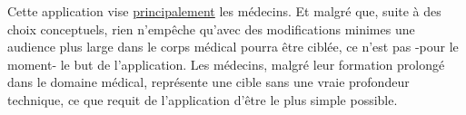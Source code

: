Cette application vise \underline{principalement} les médecins. Et
malgré que, suite à des choix conceptuels, rien n’empêche qu’avec des
modifications minimes une audience plus large dans le corps médical
pourra être ciblée, ce n’est pas -pour le moment- le but de
l’application. Les médecins, malgré leur formation prolongé dans le
domaine médical, représente une cible sans une vraie profondeur
technique, ce que requit de l’application d’être le plus simple
possible.
